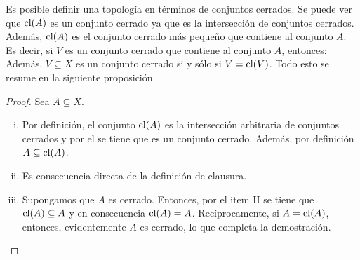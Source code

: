 Es posible definir una topología en términos de conjuntos cerrados.
Se puede ver que $\mathop{\hbox{\rm cl}}\nolimits(A)$ es un conjunto cerrado ya que es la 
intersección de conjuntos cerrados. Además, $\mathop{\hbox{\rm cl}}\nolimits(A)$
 es el conjunto cerrado más pequeño que contiene al conjunto $A$. 
Es decir, si $V$ es un conjunto cerrado que contiene al conjunto $A$, 
entonces:
Además, $V\subseteq X$ es un conjunto cerrado si y sólo si $V=\mathop{\hbox{\rm cl}}\nolimits(V)$.
Todo esto se resume en la siguiente proposición.

\begin{proof} Sea $A\subseteq X$.
\begin{enumerate}[i.]
	\item Por definición, el conjunto $\mathop{\hbox{\rm cl}}\nolimits(A)$ es la intersección arbitraria
	de conjuntos cerrados y por el  se tiene que es un conjunto cerrado.
	Además, por definición $A\subseteq\mathop{\hbox{\rm cl}}\nolimits(A)$.
	\item Es consecuencia directa de la definición de clausura.
	\item Supongamos que $A$ es cerrado. Entonces, por el item II 
	se tiene que $\mathop{\hbox{\rm cl}}\nolimits(A)\subseteq A$ y en consecuencia $\mathop{\hbox{\rm cl}}\nolimits(A)=A$.
	Recíprocamente, si $A=\mathop{\hbox{\rm cl}}\nolimits(A)$, entonces, evidentemente  $A$ es cerrado, 
	lo que completa la demostración.
\end{enumerate}
\end{proof}

